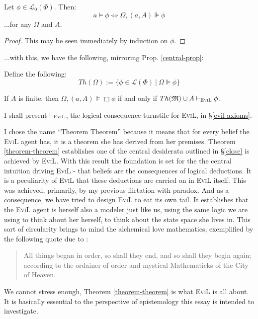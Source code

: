 \begin{lemma}[Truthiness]\label{truthiness}
  Let $\phi \in \mathcal{L}_0 (\Phi)$.  Then:
  \[ a \models \phi \Longleftrightarrow \Omega, (a, A) \VDash \phi \]
  $\ldots$for any $\Omega$ and $A$.
\end{lemma}
\begin{proof}
  This may be seen immediately by induction on $\phi$.
\end{proof}

$\ldots$with this, we have the following, mirroring Prop. \ref{central-prop}:
\begin{definition}  Define the following:
 $$Th(\Omega) := \{ \phi \in \mathcal{L}(\Phi) \ |\ \Omega \VDash \phi \}$$
\end{definition}

\begin{theorem}\label{theorem-theorem}
  If $A$ is finite, then $\Omega, (a,A) \VDash \Box \phi$ if and only if $Th(\Omega) \cup A \vdash_{\text{\textsc{EviL}}} \phi$.
\end{theorem}

I shall present $\vdash_{\text{\textsc{EviL}}}$, the logical consequence turnstile for \textsc{EviL}, in \S\ref{evil-axioms}.

I chose the name ``Theorem Theorem'' because it means that for every
belief the \textsc{EviL} agent has, it is a theorem she has derived
from her premises. Theorem \ref{theorem-theorem} establishes one of
the central desiderata outlined in \S\ref{close} is achieved by
\textsc{EviL}.  With this result the foundation is set for the the
central intuition driving \textsc{EviL} - that beliefs are the
consequences of logical deductions.  It is a peculiarity of
\textsc{EviL} that these deductions are carried on in \textsc{EviL}
itself.  This was achieved, primarily, by my previous flirtation with
paradox.  And as a consequence, we have tried to design \textsc{EviL}
to eat its own tail. 
It establishes that the \textsc{EviL} agent is
herself also a modeler just like us, using the same logic we are using
to think about her herself, to think about the state space she lives
in.  This sort of circularity brings to mind the alchemical love
mathematics, exemplified by the following quote 
due to \citet{browne_garden_1736}:
\begin{quote}
All things began in order, so shall they end, and so shall they begin
again; according to the ordainer of order and mystical Mathematicks of
the City of Heaven.\end{quote}

We cannot stress enough, Theorem \ref{theorem-theorem} is what
\textsc{EviL} is all about.  It is basically essential to the
perspective of epistemology this essay is intended to investigate.

